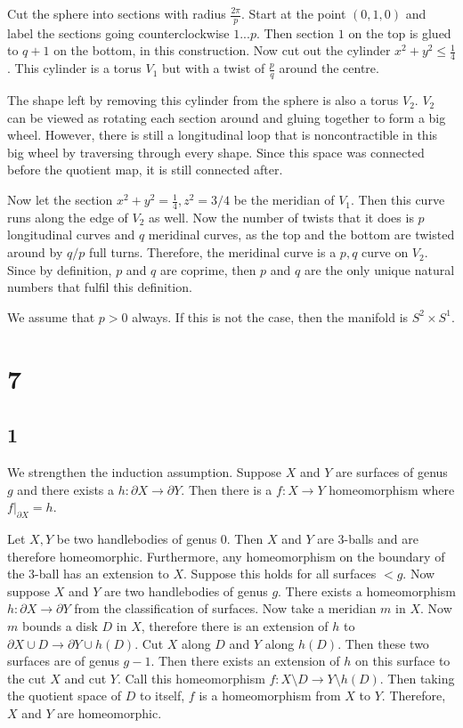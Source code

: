 \documentclass{article}
\theoremstyle{definition}
\numberwithin{theorem}{section}
\numberwithin{equation}{section}
\begin{document}
Cut the sphere into sections with radius $\frac{2\pi}{p}$. Start at the point $(0, 1, 0)$ and label the sections going counterclockwise $1 ... p$. Then section $1$ on the top is glued to $q + 1$ on the bottom, in this construction. Now cut out the cylinder $x^2 + y^2 \leq \frac{1}{4}$. This cylinder is a torus $V_1$ but with a twist of $\frac{p}{q}$ around the centre.

The shape left by removing this cylinder from the sphere is also a torus $V_2$. $V_2$ can be viewed as rotating each section around and gluing together to form a big wheel. However, there is still a longitudinal loop that is noncontractible in this big wheel by traversing through every shape. Since this space was connected before the quotient map, it is still connected after. 

Now let the section $x^2 + y^2 = \frac{1}{4}, z^2 = 3/4$ be the meridian of $V_1$. Then this curve runs along the edge of $V_2$ as well. Now the number of twists that it does is $p$ longitudinal curves and $q$ meridinal curves, as the top and the bottom are twisted around by $q/p$ full turns. Therefore, the meridinal curve is a $p, q$ curve on $V_2$. Since by definition, $p$ and $q$ are coprime, then $p$ and $q$ are the only unique natural numbers that fulfil this definition. 

We assume that $p > 0$ always. If this is not the case, then the manifold is $S^2 \times S^1$. 

\section{7}

\subsection{1}
We strengthen the induction assumption. Suppose $X$ and $Y$ are surfaces of genus $g$ and there exists a $h: \partial X \rightarrow \partial Y$. Then there is a $f : X \rightarrow Y$ homeomorphism where $f|_{\partial X}= h$. 

Let $X, Y$ be two handlebodies of genus $0$. Then $X$ and $Y$ are $3$-balls and are therefore homeomorphic. Furthermore, any homeomorphism on the boundary of the $3$-ball has an extension to $X$. Suppose this holds for all surfaces $< g$. Now suppose $X$ and $Y$ are two handlebodies of genus $g$. There exists a homeomorphism $h: \partial X \rightarrow \partial Y$ from the classification of surfaces. Now take a meridian $m$ in $X$. Now $m$ bounds a disk $D$ in $X$, therefore there is an extension of $h$ to $\partial X \cup D \rightarrow \partial Y \cup h(D)$. Cut $X$ along $D$ and $Y$ along $h(D)$. Then these two surfaces are of genus $g-1$. Then there exists an extension of $h$ on this surface to the cut $X$ and cut $Y$. Call this homeomorphism $f : X \setminus D \rightarrow Y \setminus h(D)$. Then taking the quotient space of $D$ to itself, $f$ is a homeomorphism from $X$ to $Y$. Therefore, $X$ and $Y$ are homeomorphic. 
\end{document}
